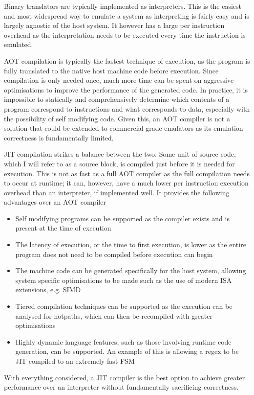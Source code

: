 Binary translators are typically implemented as interpreters. This is the easiest and most widespread way to emulate a system as interpreting is fairly easy and is largely agnostic of the host system. It however has a large per instruction overhead as the interpretation needs to be executed every time the instruction is emulated.

AOT compilation is typically the fastest technique of execution, as the program is fully translated to the native host machine code before execution. Since compilation is only needed once, much more time can be spent on aggressive optimisations to improve the performance of the generated code. In practice, it is impossible to statically and comprehensively determine which contents of a program correspond to instructions and what corresponds to data, especially with the possibility of self modifying code. Given this, an AOT compiler is not a solution that could be extended to commercial grade emulators as its emulation correctness is fundamentally limited.

JIT compilation strikes a balance between the two. Some unit of source code, which I will refer to as a source block, is compiled just before it is needed for execution. This is not as fast as a full AOT compiler as the full compilation needs to occur at runtime; it can, however, have a much lower per instruction execution overhead than an interpreter, if implemented well. It provides the following advantages over an AOT compiler

\begin{itemize}
	\item Self modifying programs can be supported as the compiler exists and is present at the time of execution
	\item The latency of execution, or the time to first execution, is lower as the entire program does not need to be compiled before execution can begin
	\item The machine code can be generated specifically for the host system, allowing system specific optimisations to be made such as the use of modern ISA extensions, e.g. SIMD
	\item Tiered compilation techniques can be supported as the execution can be analysed for hotpaths, which can then be recompiled with greater optimisations
	\item Highly dynamic language features, such as those involving runtime code generation, can be supported. An example of this is allowing a regex to be JIT compiled to an extremely fast FSM
\end{itemize}

With everything considered, a JIT compiler is the best option to achieve greater performance over an interpreter without fundamentally sacrificing correctness.